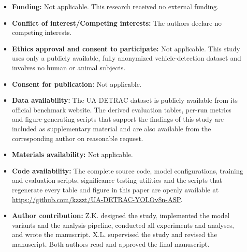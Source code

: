 \documentclass[pdflatex,sn-basic,Numbered]{sn-jnl}%
\begin{document}
\begin{itemize}
\item \textbf{Funding:} Not applicable. This research received no external funding.
\item \textbf{Conflict of interest/Competing interests:} The authors declare no competing interests.
\item \textbf{Ethics approval and consent to participate:} Not applicable. This study uses only a publicly available, fully anonymized vehicle-detection dataset and involves no human or animal subjects.
\item \textbf{Consent for publication:} Not applicable.
\item \textbf{Data availability:} The UA-DETRAC dataset is publicly available from its official benchmark website. The derived evaluation tables, per-run metrics and figure-generating scripts that support the findings of this study are included as supplementary material and are also available from the corresponding author on reasonable request.
\item \textbf{Materials availability:} Not applicable.
\item \textbf{Code availability:} The complete source code, model configurations, training and evaluation scripts, significance-testing utilities and the scripts that regenerate every table and figure in this paper are openly available at \url{https://github.com/kzzzt/UA-DETRAC-YOLOv8n-ASP}.
\item \textbf{Author contribution:} Z.K. designed the study, implemented the model variants and the analysis pipeline, conducted all experiments and analyses, and wrote the manuscript. X.L. supervised the study and revised the manuscript. Both authors read and approved the final manuscript.
\end{itemize}
\end{document}
